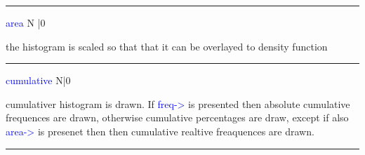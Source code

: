 \vspace{0.3cm} 
\hrule 
\vspace{0.3cm} 
\noindent \textcolor{blue}{area}  \tabto{3cm}  N |0  \tabto{5cm}    \tabto{7cm} 
\begin{changemargin}{3cm}{0cm} 
\noindent the histogram is scaled so that that it can be overlayed to density function 
\end{changemargin} 
\vspace{0.3cm} 
\hrule 
\vspace{0.3cm} 
\noindent \textcolor{blue}{cumulative}  \tabto{3cm} N|0  \tabto{5cm}    \tabto{7cm} 
\begin{changemargin}{3cm}{0cm} 
\noindent  cumulativer histogram is drawn. If \textcolor{blue}{freq->} is presented then absolute 
cumulative frequences are drawn, otherwise cumulative percentages are draw, except if also \textcolor{blue}{area->} 
is presenet then then cumulative realtive freaquences are drawn. 
\end {changemargin} 
\hrule 
\vspace{0.2cm} 
\singlespacing 
